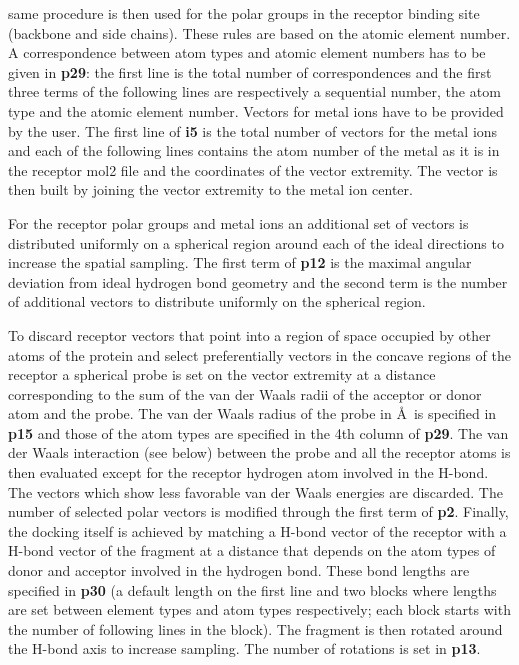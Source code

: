 \documentclass[a4paper,12pt,titlepage]{article}
\begin{document}
same procedure is then used for the polar groups in the receptor binding site (backbone and side chains). 
These 
rules are based on the atomic element number. A correspondence between atom types and atomic element 
numbers has to be given in {\bf p29}: the first line is the total number of correspondences and the first 
three terms of the following lines are respectively a sequential number, the atom type and the atomic 
element number. 
Vectors for metal ions have to be provided by the user. The first line of {\bf i5} is the total number 
of vectors for the metal ions and each of the following lines contains the atom number of the metal as 
it is in the receptor mol2 file and the coordinates of the vector extremity. The vector is then built 
by joining the vector extremity to the metal ion center. 

For the receptor polar groups and metal ions an additional set of vectors is distributed uniformly on 
a spherical region around each of the ideal directions to increase the spatial sampling. The first term 
of {\bf p12} is the maximal angular deviation from ideal hydrogen bond geometry and the second term is 
the number of additional vectors to distribute uniformly on the spherical region.

To discard receptor vectors that point into a region of space occupied by other atoms of the protein 
and select preferentially vectors in the concave regions of the receptor a spherical probe is set on 
the vector extremity at a distance corresponding to the sum of the van der Waals radii of the acceptor 
or donor atom and the probe. The van der Waals radius of the probe in \AA \, is specified in {\bf p15} and 
those of the atom types are specified in the 4th column of {\bf p29}. 
The van der Waals interaction (see below) between the probe and all the receptor atoms 
is then evaluated except for the receptor hydrogen atom involved in the H-bond. The vectors which 
show less favorable van der Waals energies are discarded. 
The number of selected polar vectors is modified through the first term of {\bf p2}. 
Finally, the docking itself is achieved by matching a H-bond vector 
of the receptor with a H-bond vector of the fragment at a distance that depends on the atom types of 
donor and acceptor involved in the hydrogen bond. These bond lengths are specified in {\bf p30} 
(a default length on the first line and two blocks where lengths are set between element types and atom 
types respectively; each block starts with the number of following lines in the block). 
The fragment is then rotated around the H-bond axis to increase sampling. The number of rotations 
is set in {\bf p13}.
\end{document}
